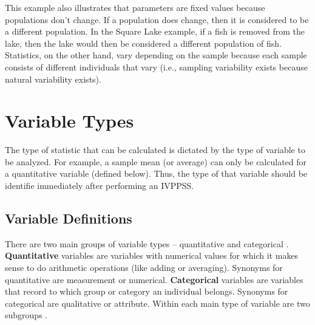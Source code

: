 \documentclass[10pt,openany]{book}\usepackage[]{graphicx}\usepackage[]{color}
\begin{document}

This example also illustrates that parameters are fixed values because populations don't change.  If a population does change, then it is considered to be a different population.  In the Square Lake example, if a fish is removed from the lake, then the lake would then be considered a different population of fish.  Statistics, on the other hand, vary depending on the sample because each sample consists of different individuals that vary (i.e., sampling variability exists because natural variability exists).



\clearpage
\section{Variable Types}\label{sect:VarTypes}
The type of statistic that can be calculated is dictated by the type of variable to be analyzed.  For example, a sample mean (or average) can only be calculated for a quantitative variable (defined below).  Thus, the type of that variable should be identifie immediately after performing an IVPPSS.

\subsection{Variable Definitions}
There are two main groups of variable types -- quantitative and categorical .  \textbf{Quantitative} variables are variables with numerical values for which it makes sense to do arithmetic operations (like adding or averaging).  Synonyms for quantitative are measurement or numerical.  \textbf{Categorical} variables are variables that record to which group or category an individual belongs.  Synonyms for categorical are qualitative or attribute.  Within each main type of variable are two subgroups .
\end{document}
